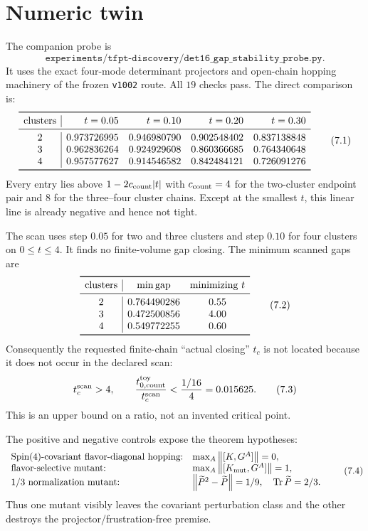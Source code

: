\section{Numeric twin}

The companion probe is
\[
 \texttt{experiments/tfpt-discovery/det16\_gap\_stability\_probe.py}.
\]
It uses the exact four-mode determinant projectors and open-chain
hopping machinery of the frozen \texttt{v1002} route.  All $19$ checks
pass.  The direct comparison is:
\[
\begin{array}{c|rrrr}
\toprule
\text{clusters}&t=0.05&t=0.10&t=0.20&t=0.30\\
\midrule
2&0.973726995&0.946980790&0.902548402&0.837138848\\
3&0.962836264&0.924929608&0.860366685&0.764340648\\
4&0.957577627&0.914546582&0.842484121&0.726091276\\
\bottomrule
\end{array}
\tag{7.1}\label{eq:numeric}
\]
Every entry lies above $1-2c_{\rm count}|t|$ with
$c_{\rm count}=4$ for the two-cluster endpoint pair and $8$ for the
three--four cluster chains.  Except at the smallest $t$, this linear
line is already negative and hence not tight.

The scan uses step $0.05$ for two and three clusters and step $0.10$
for four clusters on $0\leq t\leq4$.  It finds no finite-volume gap
closing.  The minimum scanned gaps are
\[
\begin{array}{c|cc}
\toprule
\text{clusters}&\min\gap&\text{minimizing }t\\
\midrule
2&0.764490286&0.55\\
3&0.472500856&4.00\\
4&0.549772255&0.60\\
\bottomrule
\end{array}
\tag{7.2}\label{eq:scan}
\]
Consequently the requested finite-chain ``actual closing''
$t_c$ is not located because it does not occur in the declared scan:
\[
 t_c^{\rm scan}>4,\qquad
 \frac{t_{0,\mathrm{count}}^{\rm toy}}{t_c^{\rm scan}}
 <\frac{1/16}{4}=0.015625.
\tag{7.3}\label{eq:margin}
\]
This is an upper bound on a ratio, not an invented critical point.

The positive and negative controls expose the theorem hypotheses:
\[
\begin{array}{ll}
\text{Spin(4)-covariant flavor-diagonal hopping:}
 &\max_A\left\lVert [K,G^A]\right\rVert=0,\\
\text{flavor-selective mutant:}
 &\max_A\left\lVert [K_{\rm mut},G^A]\right\rVert=1,\\
\text{$1/3$ normalization mutant:}
 &\left\lVert \widetilde P^2-\widetilde P\right\rVert=1/9,\quad
 \operatorname{Tr}\widetilde P=2/3.
\end{array}
\tag{7.4}\label{eq:mutants}
\]
Thus one mutant visibly leaves the covariant perturbation class and the
other destroys the projector/frustration-free premise.

